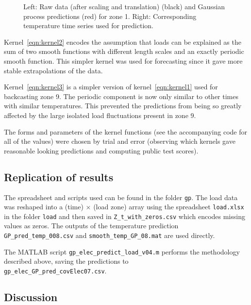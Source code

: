 \documentclass[preprint,authoryear,12pt]{elsarticle}
\begin{document}
\begin{figure}[ht]
  \begin{center}
    
  \end{center}
  \caption{Left: Raw data (after scaling and translation) (black) and Gaussian process predictions (red) for zone 1. Right: Corresponding temperature time series used for prediction.}
  \label{fig:load_pred}
\end{figure}

Kernel~\eqref{eqn:kernel2} encodes the assumption that loads can be explained as the sum of two smooth functions with different length scales and an exactly periodic smooth function.
This simpler kernel was used for forecasting since it gave more stable extrapolations of the data.

Kernel~\eqref{eqn:kernel3} is a simpler version of kernel~\eqref{eqn:kernel1} used for backcasting zone 9.
The periodic component is now only similar to other times with similar temperatures.
This prevented the predictions from being so greatly affected by the large isolated load fluctuations present in zone 9.

The forms and parameters of the kernel functions (see the accompanying code for all of the values) were chosen by trial and error (observing which kernels gave reasonable looking predictions and computing public test scores).

\subsection{Replication of results}

The spreadsheet and scripts used can be found in the folder \texttt{gp}.
The load data was reshaped into a (time) $\times$ (load zone) array using the spreadsheet \texttt{load.xlsx} in the folder \texttt{load} and then saved in \texttt{Z\_t\_with\_zeros.csv} which encodes missing values as zeros.
The outputs of the temperature prediction \texttt{GP\_pred\_temp\_008.csv} and \texttt{smooth\_temp\_GP\_08.mat} are used directly.

The MATLAB script \texttt{gp\_elec\_predict\_load\_v04.m} performs the methodology described above, saving the predictions to\\ \texttt{gp\_elec\_GP\_pred\_covElec07.csv}.

\subsection{Discussion}
\end{document}
